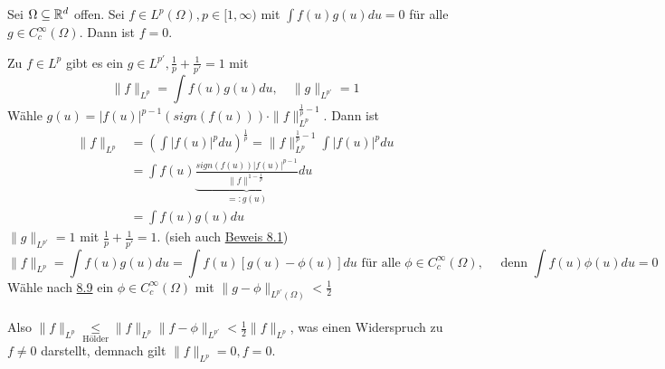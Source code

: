 \begin{kor} \label{kor:8.10}
	Sei $\Omega \subseteq \mathbb{R}^{d}$ offen. Sei $f \in L^{p}(\Omega), p \in [1, \infty)$ mit $\int f(u) g(u) du = 0$ für alle $g \in C_{c}^{\infty}(\Omega)$. Dann ist $f = 0$.
	\begin{beweis}
		Zu $f \in L^{p}$ gibt es ein $g \in L^{p'}, \frac{1}{p} + \frac{1}{p'} = 1$ mit 
		\[ \| f \|_{L^{p}} = \int f(u) g(u) du, \quad \| g \|_{L^{p'}} = 1 \]
		Wähle $g(u) = |f(u)|^{p - 1} \left( sign(f(u)) \right) \cdot \| f \|_{L^{p}}^{\frac{1}{p} - 1}$. Dann ist
		\begin{align*}
			\| f \|_{L^{p}} & = \left( \int |f(u)|^{p} du \right)^{\frac{1}{p}} = \| f \|_{L^{p}}^{\frac{1}{p} - 1} \int |f(u)|^{p} du \\
			& = \int f(u) \underbrace{\frac{sign(f(u)) |f(u)|^{p - 1}}{\| f \|^{1 - \frac{1}{p}}}}_{=: g(u)} du \\
			& = \int f(u) g(u) du
		\end{align*}
		$\| g \|_{L^{p'}} = 1$ mit $\frac{1}{p} + \frac{1}{p'} = 1$. (sieh auch \hyperref[satz:8.1]{Beweis 8.1}) 
		\[ \| f \|_{L^{p}} = \int f(u) g(u) du = \int f(u) [g(u) - \phi(u)] du \text{ für alle } \phi \in C_{c}^{\infty}(\Omega), \quad \text{ denn } \int f(u) \phi(u) du = 0 \]
		Wähle nach \hyperref[kor:8.9]{8.9} ein $\phi \in C_{c}^{\infty}(\Omega)$ mit $\| g - \phi \|_{L^{p'}(\Omega)} < \frac{1}{2}$ \\ \\
		Also $\| f \|_{L^{p}} \underset{\text{Hölder}}{\leq} \| f \|_{L^{p}} \| f - \phi \|_{L^{p'}} < \frac{1}{2} \| f \|_{L^{p}}$, was einen Widerspruch zu $f \neq 0$ darstellt, demnach gilt $\| f \|_{L^{p}} = 0, f = 0$.
	\end{beweis}
\end{kor}



\newpage	